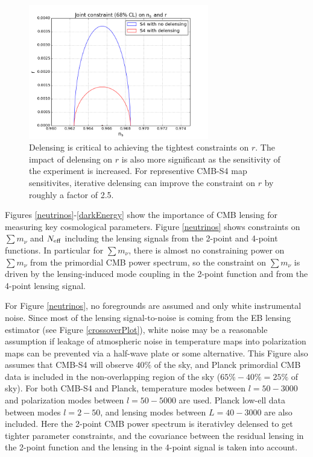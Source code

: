 \begin{figure}[htbp]
\centering
\includegraphics[width=0.7\textwidth]{CMBLensing/inflation.png}
\caption{Delensing is critical to achieving the tightest constraints on $r$.  The impact of delensing on $r$ is also more significant as the sensitivity of the experiment is increased. For representive CMB-S4 map sensitivites, iterative delensing can improve the constraint on $r$ by roughly a factor of 2.5.}
\label{inflation}
\end{figure}


Figures \ref{neutrinos}-\ref{darkEnergy} show the importance of CMB lensing for measuring key cosmological parameters.  Figure \ref{neutrinos} shows constraints on $\sum {m_\nu}$ and $N_{\rm{eff}}$ including the lensing signals from the 2-point and 4-point functions.  In particular for $\sum {m_\nu}$, there is almost no constraining power on $\sum {m_\nu}$ from the primordial CMB power spectrum, so the constraint on $\sum {m_\nu}$ is driven by the lensing-induced mode coupling in the 2-point function and from the 4-point lensing signal.  

For Figure \ref{neutrinos}, no foregrounds are assumed and only white instrumental noise.  Since most of the lensing signal-to-noise is coming from the EB lensing estimator (see Figure \ref{crossoverPlot}), white noise may be a reasonable assumption if leakage of atmospheric noise in temperature maps into polarization maps can be prevented via a half-wave plate or some alternative.  This Figure also assumes that CMB-S4 will observe $40\%$ of the sky, and Planck primordial CMB data is included in the non-overlapping region of the sky ($65\% - 40\% = 25\%$ of sky).  For both CMB-S4 and Planck, temperature modes between $l=50-3000$ and polarization modes between $l=50-5000$ are used.  Planck low-ell data between modes $l=2-50$, and lensing modes between $L=40-3000$ are also included.  Here the 2-point CMB power spectrum is iterativley delensed to get tighter parameter constraints, and the covariance between the residual lensing in the 2-point function and the lensing in the 4-point signal is taken into account.     

